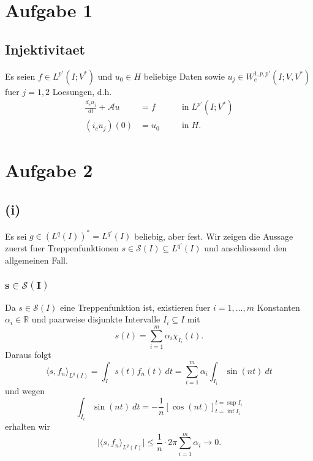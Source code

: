 \documentclass{article}
\begin{document}
\section*{Aufgabe 1}

\subsection*{Injektivitaet}

Es seien $f \in L^{p'}(I; V^*)$ und $u_0 \in H$ beliebige Daten sowie $u_j \in W_e^{1, p, p'}(I; V, V^*)$ fuer $j=1,2$ Loesungen, d.h.
\begin{equation*}
  \begin{aligned}
    \frac{d_e u_j}{dt} + \mathcal{A} u &= f \quad &&\text{in} \; L^{p'}(I; V^*)\\
    (i_c u_j)(0) &= u_0 \quad &&\text{in} \; H.
  \end{aligned}
\end{equation*}

\section*{Aufgabe 2}

\subsection*{(i)}

Es sei $g \in (L^q(I))^* = L^{q'}(I)$ beliebig, aber fest. Wir zeigen die Aussage zuerst fuer Treppenfunktionen $s \in \mathcal{S}(I) \subseteq L^{q'}(I)$ und anschliessend den allgemeinen Fall.

\subsubsection*{$\bm{s \in \mathcal{S}(I)}$}

Da $s \in \mathcal{S}(I)$ eine Treppenfunktion ist, existieren fuer $i=1, \dots, m$ Konstanten~$\alpha_i \in \mathbb{R}$ und paarweise disjunkte Intervalle $I_i \subseteq I$  mit
\begin{equation*}
  s(t)
  = \sum_{i = 1}^{m} \alpha_i \chi_{I_i}(t).
\end{equation*}
Daraus folgt
\begin{equation*}
  \langle s, f_n \rangle_{L^q(I)}
  = \int_{I}^{} s(t) f_n(t) \ dt
  = \sum_{i = 1}^{m} \alpha_i \int_{I_i} \sin(nt) \ dt
\end{equation*}
und wegen
\begin{equation*}
  \int_{I_i} \sin(nt) \ dt
  = - \frac{1}{n} [\cos(nt)]_{t = \inf I_i}^{t = \sup I_i}
\end{equation*}
erhalten wir
\begin{equation*}
  \vert \langle s, f_n \rangle_{L^q(I)} \vert
  \leq \frac{1}{n} \cdot 2 \pi \sum_{i = 1}^{m} \alpha_i
  \rightarrow 0.
\end{equation*}
\end{document}
